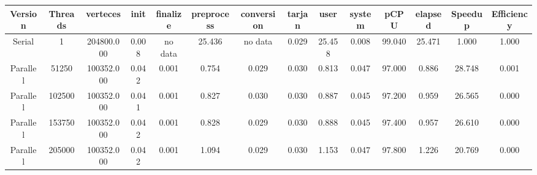 \begin{tabular}{|c|c|c|c|c|c|c|c|c|c|c|c|c|c|}
\toprule
 Version &  Threads &   verteces &  init & finalize &  preprocess & conversion &  tarjan &   user &  system &   pCPU &  elapsed &  Speedup &  Efficiency \\
\midrule
  Serial &        1 & 204800.000 & 0.008 &  no data &      25.436 &    no data &   0.029 & 25.458 &   0.008 & 99.040 &   25.471 &    1.000 &       1.000 \\
Parallel &    51250 & 100352.000 & 0.042 &    0.001 &       0.754 &      0.029 &   0.030 &  0.813 &   0.047 & 97.000 &    0.886 &   28.748 &       0.001 \\
Parallel &   102500 & 100352.000 & 0.041 &    0.001 &       0.827 &      0.030 &   0.030 &  0.887 &   0.045 & 97.200 &    0.959 &   26.565 &       0.000 \\
Parallel &   153750 & 100352.000 & 0.042 &    0.001 &       0.828 &      0.029 &   0.030 &  0.888 &   0.045 & 97.400 &    0.957 &   26.610 &       0.000 \\
Parallel &   205000 & 100352.000 & 0.042 &    0.001 &       1.094 &      0.029 &   0.030 &  1.153 &   0.047 & 97.800 &    1.226 &   20.769 &       0.000 \\
\bottomrule
\end{tabular}
